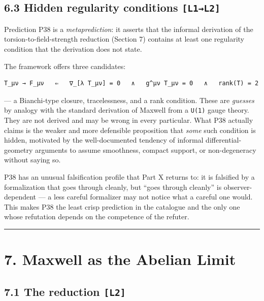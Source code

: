 \documentclass[
  11pt]{report}
\begin{document}
\hypertarget{hidden-regularity-conditions-l1l2}{%
\section{\texorpdfstring{6.3 Hidden regularity conditions
\texttt{{[}L1→L2{]}}}{6.3 Hidden regularity conditions {[}L1→L2{]}}}\label{hidden-regularity-conditions-l1l2}}

Prediction P38 is a \emph{metaprediction}: it asserts that the informal
derivation of the torsion-to-field-strength reduction (Section 7)
contains at least one regularity condition that the derivation does not
state.

The framework offers three candidates:

\begin{verbatim}
T_μν → F_μν   ⇐   ∇_[λ T_μν] = 0   ∧   g^μν T_μν = 0   ∧   rank(T) = 2
\end{verbatim}

--- a Bianchi-type closure, tracelessness, and a rank condition. These
are \emph{guesses} by analogy with the standard derivation of Maxwell
from a \texttt{U(1)} gauge theory. They are not derived and may be wrong
in every particular. What P38 actually claims is the weaker and more
defensible proposition that \emph{some} such condition is hidden,
motivated by the well-documented tendency of informal
differential-geometry arguments to assume smoothness, compact support,
or non-degeneracy without saying so.

P38 has an unusual falsification profile that Part X returns to: it is
falsified by a formalization that goes through cleanly, but ``goes
through cleanly'' is observer-dependent --- a less careful formalizer
may not notice what a careful one would. This makes P38 the least crisp
prediction in the catalogue and the only one whose refutation depends on
the competence of the refuter.

\begin{center}\rule{0.5\linewidth}{0.5pt}\end{center}

\hypertarget{maxwell-as-the-abelian-limit}{%
\chapter{7. Maxwell as the Abelian
Limit}\label{maxwell-as-the-abelian-limit}}

\hypertarget{the-reduction-l2}{%
\section{\texorpdfstring{7.1 The reduction
\texttt{{[}L2{]}}}{7.1 The reduction {[}L2{]}}}\label{the-reduction-l2}}
\end{document}

